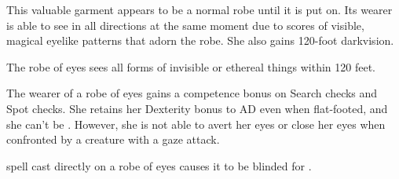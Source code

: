 \begin{comment}
Robe of Bones: This handy item functions much like a robe of useful items for the serious necromancer. It appears to be an unremarkable robe, but a character who dons it notes that it is adorned with small embroidered figures representing undead creatures. Only the wearer of the robe can see the embroidery and recognize them for the creatures they become, and detach them. One figure can be detached each round. Detaching a figure causes it to become an actual undead creature (see the list below). The skeleton or zombie is not under the control of the wearer of the robe, but may be subsequently commanded, rebuked, turned, or destroyed. A newly created robe of bones always has two embroidered figures of each of the following undead:
\begin{itemize}
\item Small goblin skeleton
\item Medium human commoner skeleton
\item Medium wolf skeleton
\item Small goblin zombie
\item Medium human commoner zombie
\item Medium wolf zombie
\end{itemize}

Moderate necromancy [evil]; CL 6th; Craft Wondrous Item, animate dead; Price 2,400 gp; Weight 1 lb.
\end{comment}
 This valuable garment appears to be a normal robe until it is put on. Its wearer is able to see in all directions at the same moment due to scores of visible, magical eyelike patterns that adorn the robe. She also gains 120-foot darkvision.

The robe of eyes sees all forms of invisible or ethereal things within 120 feet.

The wearer of a robe of eyes gains a  competence bonus on Search checks and Spot checks. She retains her Dexterity bonus to AD even when flat-footed, and she can't be . However, she is not able to avert her eyes or close her eyes when confronted by a creature with a gaze attack.

 spell cast directly on a robe of eyes causes it to be blinded for .

